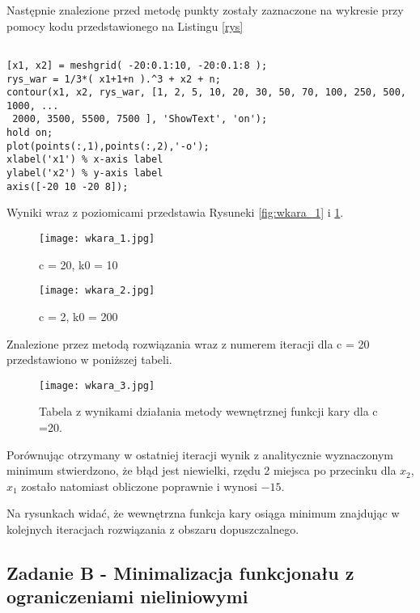 \documentclass[a4paper,15pt]{article}
\begin{document}
Następnie znalezione przed metodę punkty zostały zaznaczone na wykresie przy pomocy kodu przedstawionego na Listingu \ref{rys}
\begin{lstlisting}[caption=Rysowanie punktów, captionpos=b,
label=rys, firstnumber=12,frame=single]
% Rysowanie punktow 

[x1, x2] = meshgrid( -20:0.1:10, -20:0.1:8 ); 
rys_war = 1/3*( x1+1+n ).^3 + x2 + n;
contour(x1, x2, rys_war, [1, 2, 5, 10, 20, 30, 50, 70, 100, 250, 500, 1000, ...
 2000, 3500, 5500, 7500 ], 'ShowText', 'on');
hold on; 
plot(points(:,1),points(:,2),'-o');
xlabel('x1') % x-axis label
ylabel('x2') % y-axis label
axis([-20 10 -20 8]);
\end{lstlisting}


Wyniki wraz z poziomicami przedstawia Rysuneki \ref{fig:wkara_1} i \ref{fig:wkara_2}.

\begin{figure}[H]


  \texttt{[image: wkara\_1.jpg]}
  \caption{c = 20, k0 = 10}
  \label{fig:wkara_1}

\endminipage\hfill
{}%

  \texttt{[image: wkara\_2.jpg]}
  \caption{c = 2, k0 = 200}
  \label{fig:wkara_2}

\endminipage

\end{figure}

Znalezione przez metodą rozwiązania wraz z numerem iteracji dla c = 20 przedstawiono w poniższej tabeli.  
\begin{figure}[H]
\centerline{\texttt{[image: wkara\_3.jpg]}}
\centering
\caption{Tabela z wynikami działania metody wewnętrznej funkcji kary dla c =20.}
\label{fig:wkara_3}
\end{figure}

Porównując otrzymany w ostatniej iteracji wynik z analitycznie wyznaczonym minimum stwierdzono, że błąd jest niewielki, rzędu 2 miejsca po przecinku dla \( x_{2} \), \( x_{1} \) zostało natomiast obliczone poprawnie i wynosi \( -15 \).   

Na rysunkach widać, że wewnętrzna funkcja kary osiąga minimum znajdując w kolejnych iteracjach rozwiązania z obszaru dopuszczalnego. 
 
\subsection{Zadanie B - Minimalizacja funkcjonału z ograniczeniami nieliniowymi }
\end{document}
